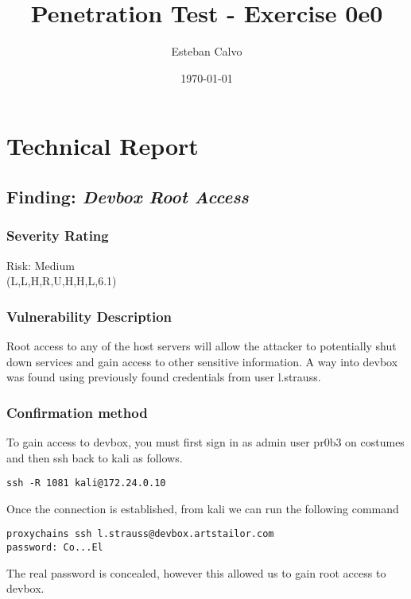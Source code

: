 \documentclass[notitlepage]{article}
\begin{document}
  
\title{Penetration Test - Exercise 0e0}
\author{Esteban Calvo}
\date{\isodate\today}

\maketitle

\tableofcontents

\newpage
\section{Technical Report}


  \subsection{Finding: \emph{Devbox Root Access}}
  
	\subsubsection*{Severity Rating}
    Risk: Medium \\
	\cvss(L,L,H,R,U,H,H,L,6.1)
		
  	\subsubsection*{Vulnerability Description}
    Root access to any of the host servers will allow the attacker to potentially shut down services and gain access to other sensitive information. A way into
    devbox was found using previously found credentials from user l.strauss.

  	\subsubsection*{Confirmation method}
    To gain access to devbox, you must first sign in as admin user pr0b3 on costumes and then ssh back to kali as follows.
 \begin{verbatim}
ssh -R 1081 kali@172.24.0.10
  \end{verbatim}
    Once the connection is established, from kali we can run the following command
\begin{verbatim}
proxychains ssh l.strauss@devbox.artstailor.com
password: Co...El
\end{verbatim}
    The real password is concealed, however this allowed us to gain root access to devbox.
\end{document}
